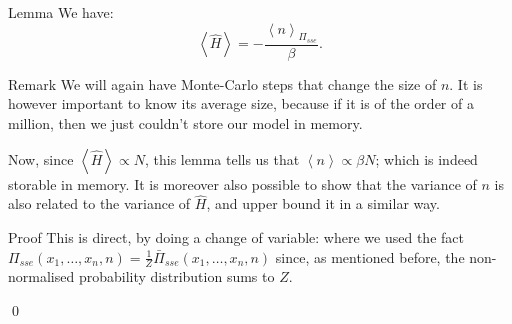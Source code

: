 \documentclass[a4paper]{article}
\begin{document}
\begin{parag}{Lemma}
    We have: 
    \[\left\langle \hat{H} \right\rangle = -\frac{\left\langle n \right\rangle_{\Pi_{sse}}}{\beta}.\]

    \begin{subparag}{Remark}
        We will again have Monte-Carlo steps that change the size of $n$. It is however important to know its average size, because if it is of the order of a million, then we just couldn't store our model in memory. 

        Now, since $\left\langle \hat{H} \right\rangle \propto N$, this lemma tells us that $\left\langle n \right\rangle \propto \beta N$; which is indeed storable in memory. It is moreover also possible to show that the variance of $n$ is also related to the variance of $\hat{H}$, and upper bound it in a similar way.
    \end{subparag}
    
    \begin{subparag}{Proof}
        This is direct, by doing a change of variable:
        where we used the fact $\Pi_{sse}\left(x_1, \ldots, x_n, n\right) = \frac{1}{Z} \bar{\Pi}_{sse}\left(x_1, \ldots, x_n, n\right)$ since, as mentioned before, the non-normalised probability distribution sums to $Z$.

        \qed
    \end{subparag}
\end{parag}
\end{document}
